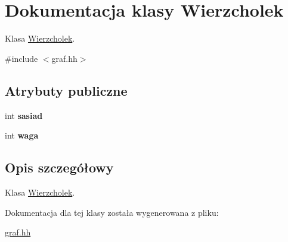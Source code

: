 \hypertarget{class_wierzcholek}{\section{\-Dokumentacja klasy \-Wierzcholek}
\label{class_wierzcholek}
}


\-Klasa \hyperlink{class_wierzcholek}{\-Wierzcholek}.  




{\ttfamily \#include $<$graf.\-hh$>$}

\subsection*{\-Atrybuty publiczne}
\begin{DoxyCompactItemize}
\item 
\hypertarget{class_wierzcholek_a064e9d988e2bf41110c06f50ee4a7549}{int {\bfseries sasiad}}\label{class_wierzcholek_a064e9d988e2bf41110c06f50ee4a7549}

\item 
\hypertarget{class_wierzcholek_a75fca22ce5c86f0cbf29276f7f5204c3}{int {\bfseries waga}}\label{class_wierzcholek_a75fca22ce5c86f0cbf29276f7f5204c3}

\end{DoxyCompactItemize}


\subsection{\-Opis szczegółowy}
\-Klasa \hyperlink{class_wierzcholek}{\-Wierzcholek}. 



\-Dokumentacja dla tej klasy została wygenerowana z pliku\-:\begin{DoxyCompactItemize}
\item 
\hyperlink{graf_8hh}{graf.\-hh}\end{DoxyCompactItemize}
